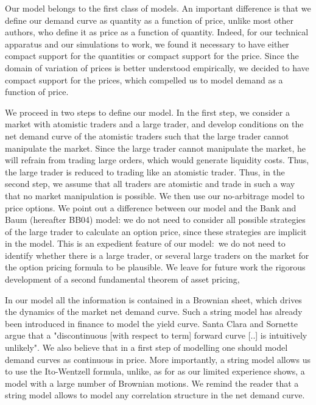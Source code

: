 \documentclass{article}
\begin{document}
Our model belongs to the first class of models. An important difference is
that we define our demand curve as quantity as a function of price, unlike
most other authors, who define it as price as a function of quantity.
Indeed, for our technical apparatus and our simulations to work, we found it
necessary to have either compact support for the quantities or compact
support for the price. Since the domain of variation of prices is better
understood empirically, we decided to have compact support for the prices,
which compelled us to model demand as a function of price.

We proceed in two steps to define our model. In the first step, we consider
a market with atomistic traders and a large trader, and develop conditions
on the net demand curve of the atomistic traders such that the large trader
cannot manipulate the market. Since the large trader cannot manipulate the
market, he will refrain from trading large orders, which would generate
liquidity costs. Thus, the large trader is reduced to trading like an
atomistic trader. Thus, in the second step, we assume that all traders are
atomistic and trade in such a way that no market manipulation is possible.
We then use our no-arbitrage model to price options. We point out a
difference between our model and the Bank and Baum (hereafter BB04) model:
we do not need to consider all possible strategies of the large trader to
calculate an option price, since these strategies are implicit in the model.
This is an expedient feature of our model:\ we do not need to identify
whether there is a large trader, or several large traders on the market for
the option pricing formula to be plausible. We leave for future work the
rigorous development of a second fundamental theorem of asset pricing,

In our model all the information is contained in a Brownian sheet, which
drives the dynamics of the market net demand curve. Such a string model has
already been introduced in finance to model the yield curve. Santa Clara and
Sornette \cite{SCS01} argue that a "discontinuous [with respect to term]
forward curve [..] is intuitively unlikely". We also believe that in a first
step of modelling one should model demand curves as continuous in price.
More importantly, a string model allows us to use the Ito-Wentzell formula,
unlike, as for as our limited experience shows, a model with a large number
of Brownian motions. We remind the reader that a string model allows to
model any correlation structure in the net demand curve.
\end{document}
